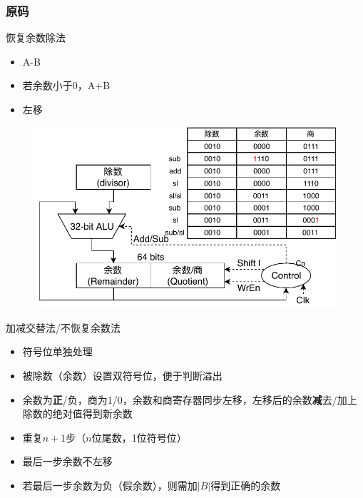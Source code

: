 \subsubsection{原码}
恢复余数除法
\begin{itemize}
	\item A-B
	\item 若余数小于0，A+B
	\item 左移
\end{itemize}
\begin{figure}
\centering
\includegraphics[width=0.6\linewidth]{fig/Arithmetic-Division.pdf}
\end{figure}
加减交替法/不恢复余数法
\begin{itemize}
	\item 符号位单独处理
	\item 被除数（余数）设置双符号位，便于判断溢出
	\item 余数为\textbf{正}/负，商为1/0，余数和商寄存器同步左移，左移后的余数\textbf{减}去/加上除数的绝对值得到新余数
	\item 重复$n+1$步（$n$位尾数，1位符号位）
	\item 最后一步余数不左移
	\item 若最后一步余数为负（假余数），则需加$|B|$得到正确的余数
\end{itemize}

